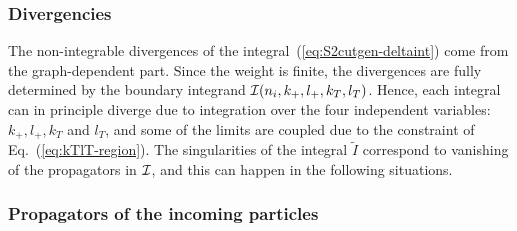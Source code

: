 \documentclass[a4paper,11pt]{article}
\numberwithin{equation}{section}
\begin{document}
\subsubsection{Divergencies}

The non-integrable divergences of the integral~(\ref{eq:S2cutgen-deltaint}) come
from the graph-dependent part. Since the weight is finite, the divergences
are fully determined by the boundary integrand ${\cal I}(n_i, k_+, l_+, k_T,
l_T)$.
%
Hence, each integral can in principle diverge due to integration over the four
independent variables:  $k_+, l_+, k_T$ and $l_T$, and some of the limits are
coupled due to the constraint of Eq.~(\ref{eq:kTlT-region}).
%
The singularities of the integral $\tilde I$ correspond to vanishing of the
propagators in $\cal I$, and this can happen in the following situations.

\subsubsection*{Propagators of the incoming particles}
\end{document}
